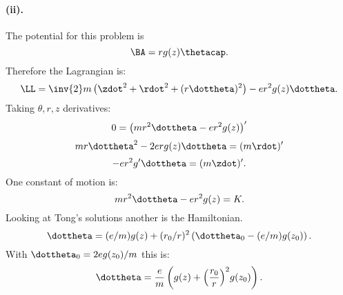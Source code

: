 {\paragraph{(ii).}
%
The potential for this problem is
%
\begin{equation}\label{eqn:tongMf1:2000}
\BA =  r g(z) \thetacap.
\end{equation}
%
Therefore the Lagrangian is:
\begin{equation}\label{eqn:tongMf1:2020}
\LL = \inv{2} m \left(\zdot^2 + \rdot^2 + (r\dottheta)^2\right) - e r^2 g(z) \dottheta.
\end{equation}
%
Taking \(\theta, r, z\) derivatives:
\begin{equation}\label{eqn:tongMf1:2040}
0 = \left(mr^2 \dottheta - e r^2 g(z)\right)'
\end{equation}
\begin{equation}\label{eqn:tongMf1:2060}
mr \dottheta^2 - 2 e r g(z) \dottheta = (m \rdot)'
\end{equation}
\begin{equation}\label{eqn:tongMf1:2080}
-e r^2 g' \dottheta = ( m \zdot )'.
\end{equation}
%
One constant of motion is:
%
\begin{equation}\label{eqn:tongMf1:2100}
mr^2 \dottheta - e r^2 g(z) = K.
\end{equation}
%
Looking at Tong's solutions another is the Hamiltonian.
%
\begin{equation}\label{eqn:tongMf1:2120}
\dottheta = (e/m) g(z) + (r_0/r)^2 \left(\dottheta_0 - (e/m) g(z_0)\right).
\end{equation}
%
With \(\dottheta_0 = 2 e g(z_0)/m\) this is:
%
\begin{equation}\label{eqn:tongMf1:2140}
\dottheta = \frac{e}{m} \left(g(z) + {\left(\frac{r_0}{r}\right)}^2 g(z_0)\right).
\end{equation}
%
}
%

